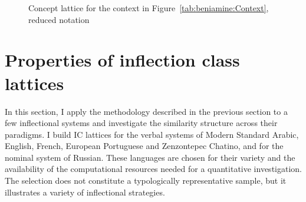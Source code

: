 \documentclass[output=paper]{langscibook}
\begin{document}
    \begin{figure}
        \caption{Concept lattice for the context in Figure~\ref{tab:beniamine:Context}, reduced notation}
        \label{fig:beniamine:latticeEn2}
    \end{figure}


    \section{Properties of inflection class lattices}
    \label{Section:beniamine:properies-of-IC-lattices}\largerpage[2]

    In this section, I apply the methodology described in the previous section to a few inflectional systems and investigate the similarity structure across their paradigms. I build IC lattices for the verbal systems of Modern Standard Arabic, English, French, European Portuguese and Zenzontepec Chatino, and for the nominal system of Russian. These languages are chosen for their variety and the availability of the computational resources needed for a quantitative investigation. The selection does not constitute a typologically representative sample, but it illustrates a variety of inflectional strategies.
\end{document}

